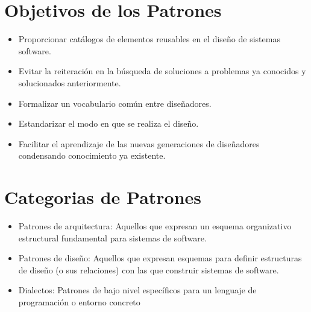 \documentclass[10pt]{article}
\begin{document}

\section{Objetivos de los Patrones}
\begin{itemize}

\item Proporcionar catálogos de elementos reusables en el diseño de sistemas software.
\item Evitar la reiteración en la búsqueda de soluciones a problemas ya conocidos y solucionados anteriormente.
\item Formalizar un vocabulario común entre diseñadores.
\item Estandarizar el modo en que se realiza el diseño.
\item Facilitar el aprendizaje de las nuevas generaciones de diseñadores condensando conocimiento ya existente.
\end{itemize}

\section{Categorias de Patrones}
\begin{itemize}

\item Patrones de arquitectura: Aquellos que expresan un esquema organizativo estructural fundamental para 
sistemas de software.
\item Patrones de diseño: Aquellos que expresan esquemas para definir estructuras de diseño (o sus relaciones) 
con las que construir sistemas de software.
\item Dialectos: Patrones de bajo nivel específicos para un lenguaje de programación o entorno concreto
\end{itemize}
\end{document}
